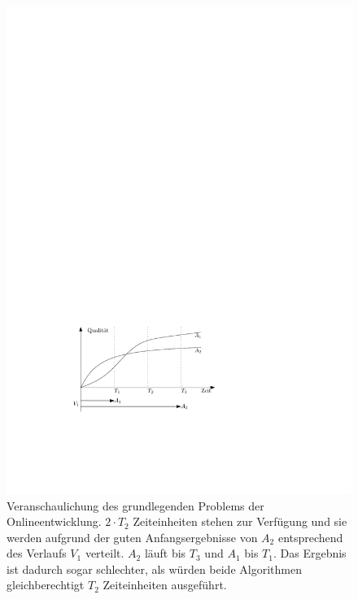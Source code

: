 \begin{figure}[h]
\centering
\includegraphics{onlineproblem.pdf}
\caption[Onlineentwicklungsproblem]{Veranschaulichung des grundlegenden Problems der Onlineentwicklung. $2 \cdot T_2$ Zeiteinheiten stehen zur Verfügung und sie werden aufgrund der guten Anfangsergebnisse von $A_2$ entsprechend des Verlaufs $V_1$ verteilt. $A_2$ läuft bis $T_3$ und $A_1$ bis $T_1$. Das Ergebnis ist dadurch sogar schlechter, als würden beide Algorithmen gleichberechtigt $T_2$ Zeiteinheiten ausgeführt.}
\label{online}
\end{figure}



